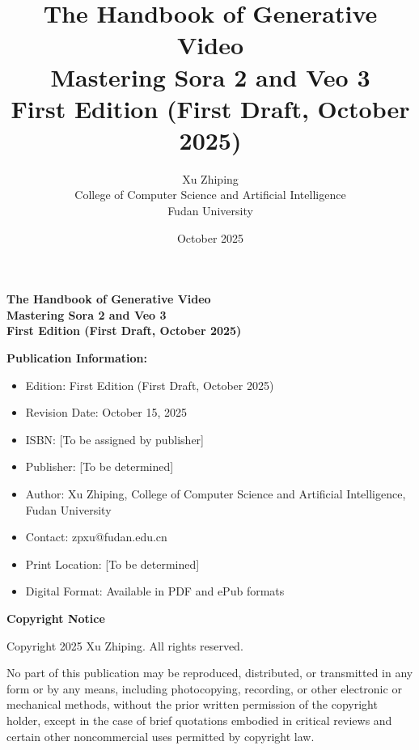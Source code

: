 \documentclass[11pt,a4paper,openright]{book}
\begin{document}
\frontmatter

\title{The Handbook of Generative Video\\
\large Mastering Sora 2 and Veo 3\\
\small First Edition (First Draft, October 2025) }
\author{Xu Zhiping\\
\small College of Computer Science and Artificial Intelligence\\
\small Fudan University}
\date{October 2025}

\maketitle

\newpage
\thispagestyle{empty}
\vspace*{0.5cm}

\begin{center}
\textbf{The Handbook of Generative Video}\\
\textbf{Mastering Sora 2 and Veo 3}\\
\textbf{First Edition (First Draft, October 2025)}
\end{center}

\vspace{1cm}

\textbf{Publication Information:}
\begin{itemize}
\item Edition: First Edition (First Draft, October 2025)
\item Revision Date: October 15, 2025
\item ISBN: [To be assigned by publisher]
\item Publisher: [To be determined]
\item Author: Xu Zhiping, College of Computer Science and Artificial Intelligence, Fudan University
\item Contact: zpxu@fudan.edu.cn
\item Print Location: [To be determined]
\item Digital Format: Available in PDF and ePub formats
\end{itemize}

\vspace{0.5cm}

\textbf{Copyright Notice}

Copyright \textcopyright{} 2025 Xu Zhiping. All rights reserved.

No part of this publication may be reproduced, distributed, or transmitted in any form or by any means, including photocopying, recording, or other electronic or mechanical methods, without the prior written permission of the copyright holder, except in the case of brief quotations embodied in critical reviews and certain other noncommercial uses permitted by copyright law.
\end{document}
